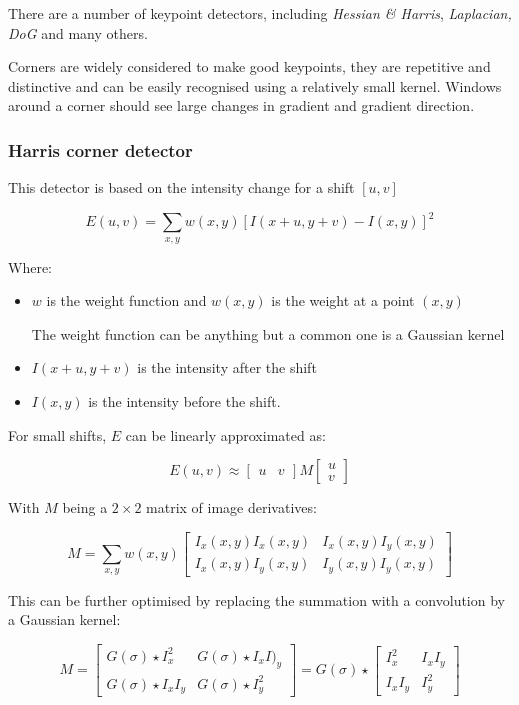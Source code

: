 \documentclass{article}
\begin{document}
There are a number of keypoint detectors, including \textit{Hessian \& Harris}, \textit{Laplacian, DoG} and many others.

Corners are widely considered to make good keypoints, they are repetitive and distinctive and can be easily recognised using a relatively small kernel. Windows around a corner should see large changes in gradient and gradient direction.

\subsubsection{Harris corner detector}

This detector is based on the intensity change for a shift $[u,v]$

\[
  E(u,v) = \sum_{x,y} w(x,y) [I(x+u,y+v) - I(x,y)]^{2}
\]

Where:

\begin{itemize}
  \item $w$ is the weight function and $w(x,y)$ is the weight at a point $(x,y)$

        The weight function can be anything but a common one is a Gaussian kernel

  \item $I(x+u,y+v)$ is the intensity after the shift
  \item $I(x,y)$ is the intensity before the shift.
\end{itemize}

For small shifts, $E$ can be linearly approximated as:

\[
  E(u,v) \approx \begin{bmatrix}
    u & v
  \end{bmatrix}
 M \begin{bmatrix}
    u\\ v
  \end{bmatrix}
\]

With $M$ being a $2 \times 2$ matrix of image derivatives:

\[
  M = \sum_{x,y} w(x,y) \begin{bmatrix}
    I_{x}(x,y)I_{x}(x,y) & I_{x}(x,y)I_{y}(x,y) \\
    I_{x}(x,y)I_{y}(x,y) & I_{y}(x,y)I_{y}(x,y)
  \end{bmatrix}
\]

This can be further optimised by replacing the summation with a convolution by a Gaussian kernel:

\[
  M = \begin{bmatrix}
    G(\sigma)\star I_{x}^{2} & G(\sigma)\star I_{x}I)_{y} \\
    G(\sigma)\star I_{x}I_{y} & G(\sigma)\star I_{y}^{2}
  \end{bmatrix} =
  G(\sigma) \star \begin{bmatrix}
    I_{x}^{2} & I_{x}I_{y} \\
    I_{x}I_{y} & I_{y}^{2}
  \end{bmatrix}
\]
\end{document}

